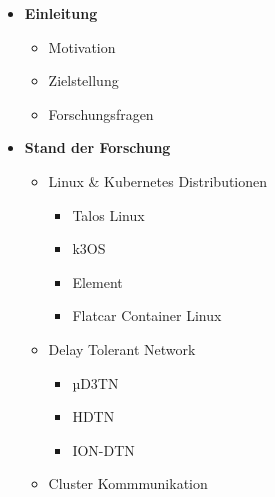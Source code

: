 \documentclass[
  ngerman,
  symmetric,
  cdfont=on,
  numbers=noenddot,
  parskip
]{tudscrreprt}
\begin{document}
\begin{itemize}[label=\textbullet, nosep]
  \item \textbf{Einleitung}
    \begin{itemize}[label=--]
      \item Motivation 
      \item Zielstellung
      \item Forschungsfragen
    \end{itemize}

  \item \textbf{Stand der Forschung}
    \begin{itemize}[label=--]
      \item Linux \& Kubernetes Distributionen
        \begin{itemize}[label=--]
          \item Talos Linux
          \item k3OS
          \item Element 
          \item Flatcar Container Linux 
        \end{itemize}
    \end{itemize}
    \begin{itemize}[label=--]
      \item Delay Tolerant Network
        \begin{itemize}[label=--]
          \item µD3TN
          \item HDTN
          \item ION-DTN
        \end{itemize}
      \item Cluster Kommmunikation
    \end{itemize}


\end{itemize}
\end{document}
